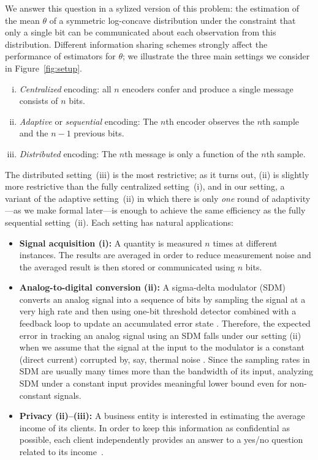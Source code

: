 We answer this question in a sylized version of this problem: the estimation
of the mean $\theta$ of a symmetric log-concave distribution under the
constraint that only a single bit can be communicated about each observation
from this distribution.
Different information sharing schemes strongly affect the
performance of estimators for $\theta$; we illustrate
the three main settings we consider in Figure~\ref{fig:setup}.
\begin{enumerate}[(i)]
\item \emph{Centralized} encoding: all $n$ encoders confer and produce a
  single message consists of $n$ bits.
 \item \emph{Adaptive} or \emph{sequential} encoding: The $n$th encoder
   observes the $n$th sample and the $n-1$ previous bits.
 \item \emph{Distributed} encoding: The $n$th message is only a function of
   the $n$th sample.
\end{enumerate}
The distributed setting~(iii) is the most restrictive; as it turns out,
(ii) is slightly more restrictive than the fully centralized setting~(i),
and in our setting, a variant of the adaptive setting~(ii)
in which there is only \emph{one} round of adaptivity---as we make formal
later---is enough to achieve the same efficiency as the fully sequential
setting~(ii).
Each setting has natural applications:
\begin{itemize}
\item {\bf Signal acquisition (i):} A quantity is measured $n$ times at
  different instances. The results are averaged in order to reduce
  measurement noise and the averaged result is then stored or communicated
  using $n$ bits.
\item {\bf Analog-to-digital conversion (ii):} A sigma-delta modulator (SDM)
  converts an analog signal into a sequence of bits by sampling the signal
  at a very high rate and then using one-bit threshold detector combined
  with a feedback loop to update an accumulated error state
  \cite{1092194}. Therefore, the expected error in tracking an analog signal
  using an SDM falls under our setting (ii) when we assume that the signal
  at the input to the modulator is a constant (direct current) corrupted by,
  say, thermal noise \cite{53738}. Since the sampling rates in SDM are
  usually many times more than the bandwidth of its input, analyzing SDM
  under a constant input provides meaningful lower bound even for
  non-constant signals.
\item {\bf Privacy (ii)--(iii):} A business entity is interested in
  estimating the average income of its clients. In order to keep this
  information as confidential as possible, each client independently
  provides an answer to a yes/no question related to its
  income~\cite{DuchiJoWa18}.
\end{itemize}


